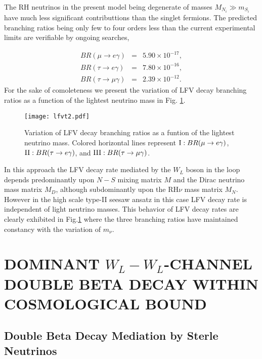 \documentclass[a4paper,11pt]{article}
\newcommand{\bea}{\begin{eqnarray}}
\newcommand{\eea}{\end{eqnarray}}
\begin{document}
 The  RH neutrinos in the present  model being degenerate of masses
 $M_{N_i}\gg m_{S_i}$ have much less significant contributtions than the singlet fermions. The predicted branching ratios 
being only few to four orders less than the current experimental
limits \cite{lfvexpt} are verifiable by ongoing searches,

\bea
BR(\mu \to e\gamma)&=&5.90\times 10^{-17},\nonumber\\
BR(\tau \to e\gamma)&=&7.80\times 10^{-16},\nonumber\\
BR(\tau \to \mu\gamma)&=&2.39\times 10^{-12}.\label{lfvbr}
\eea 
For the sake of comoleteness we present the variation of LFV decay branching ratios as a function of the lightest neutrino mass in Fig. \ref{lfvbrs}. \\     
  \begin{figure}[htbp]
 \texttt{[image: lfvt2.pdf]}
 \caption{Variation of LFV decay branching ratios as a funtion of the
   lightest neutrino mass. Colored horizontal lines represent 
${\rm I}:BR(\mu \to e\gamma)$, ${\rm II}:BR(\tau \to e\gamma)$, and ${\rm III}:BR(\tau \to \mu\gamma)$. }   
\label{lfvbrs}
\end{figure}

 In this approach the LFV decay rate
mediated by the $W_L$ boson in the loop depends predominantly upon $N-S$ mixing matrix $M$
and the Dirac neutrino mass matrix $M_D$, although subdominantly upon
the RH$\nu$ mass matrix $M_N$. However in the high scale type-II seesaw
 ansatz in this case
 LFV decay rate is independent of  light neutrino masses. This behavior
 of LFV decay rates are clearly exhibited in Fig.\ref{lfvbrs} where
 the three branching ratios have maintained constancy with the
 variation of $m_{\nu}$.



\section{\bf DOMINANT $W_L-W_L$-CHANNEL DOUBLE BETA DECAY WITHIN COSMOLOGICAL BOUND}\label{sec:bb}
\subsection{Double Beta Decay Mediation by Sterle Neutrinos}  
\end{document}
